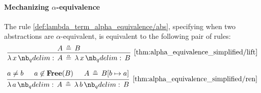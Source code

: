 \paragraph{Mechanizing \( \alpha \)-equivalence}

\begin{proposition}\label{thm:alpha_equivalence_simplified}
  The rule \ref{def:lambda_term_alpha_equivalence/abs}, specifying when two abstractions are \( \alpha \)-equivalent, is equivalent to the following pair of rules:
  \begin{equation*}\taglabel[\( \logic{Lift}_\alpha \)]{thm:alpha_equivalence_simplified/lift}
    \begin{prooftree}
      \hypo{ A \aequiv B }
      \infer1[\ref{thm:alpha_equivalence_simplified/lift}]{ \qabs x A \aequiv \qabs x B }
    \end{prooftree}
  \end{equation*}

  \begin{equation*}\taglabel[\( \logic{Ren}_\alpha \)]{thm:alpha_equivalence_simplified/ren}
    \begin{prooftree}
      \hypo{ a \neq b }
      \hypo{ a \not\in \op*{Free}(B) }
      \hypo{ A \aequiv B[b \mapsto a] }
      \infer3[\ref{thm:alpha_equivalence_simplified/ren}]{ \qabs a A \aequiv \qabs b B }
    \end{prooftree}
  \end{equation*}
\end{proposition}
